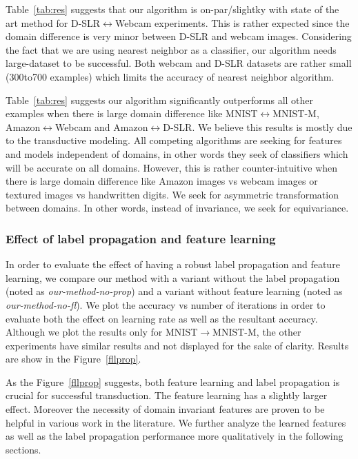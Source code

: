 Table~\ref{tab:res} suggests that our algorithm is on-par/slightky with state of the art method for D-SLR$\leftrightarrow$Webcam experiments. This is rather expected since the domain difference is very minor between D-SLR and webcam images. Considering the fact that we are using nearest neighbor as a classifier, our algorithm needs large-dataset to be successful. Both webcam and D-SLR datasets are rather small (300to700 examples) which limits the accuracy of nearest neighbor algorithm.

Table~\ref{tab:res} suggests our algorithm significantly outperforms all other examples when there is large domain difference like MNIST$\leftrightarrow$MNIST-M, Amazon$\leftrightarrow$Webcam and Amazon$\leftrightarrow$D-SLR. We believe this results is mostly due to the transductive modeling. All competing algorithms are seeking for features and models independent of domains, in other words they seek of classifiers which will be accurate on all domains. However, this is rather counter-intuitive when there is large domain difference like Amazon images vs webcam images or textured images vs handwritten digits. We seek for asymmetric transformation between domains. In other words, instead of invariance, we seek for equivariance. 


\subsubsection{Effect of label propagation and feature learning}
In order to evaluate the effect of having a robust label propagation and feature learning, we compare our method with a variant without the label propagation (noted as \emph{our-method-no-prop}) and a variant without feature learning (noted as \emph{our-method-no-fl}). We plot the accuracy vs number of iterations in order to evaluate both the effect on learning rate as well as the resultant accuracy. Although we plot the results only for MNIST$\rightarrow$MNIST-M, the other experiments have similar results and not displayed for the sake of clarity. Results are show in the Figure~\ref{fllprop}. 

As the Figure~\ref{fllprop} suggests, both feature learning and label propagation is crucial for successful transduction. The feature learning has a slightly larger effect. Moreover the necessity of domain invariant features are proven to be helpful in various work\cite{ganin15, tzeng14} in the literature. We further analyze the learned features as well as the label propagation performance more qualitatively in the following sections.

